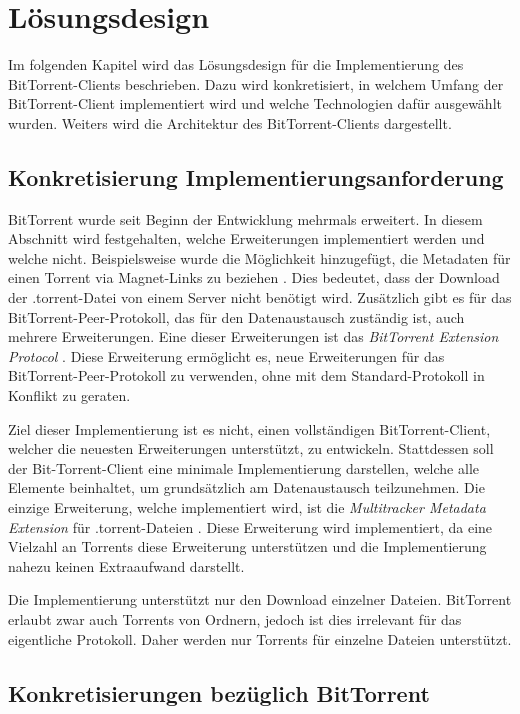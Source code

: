 \chapter{Lösungsdesign}
\label{cha:Lösungsdesign}
Im folgenden Kapitel wird das Lösungsdesign für die Implementierung des Bit\-Torrent-Clients beschrieben. Dazu wird konkretisiert, in welchem Umfang der Bit\-Torrent-Client implementiert wird und welche Technologien dafür ausgewählt wurden. Weiters wird die Architektur des BitTorrent-Clients dargestellt.

\section{Konkretisierung Implementierungsanforderung}

 BitTorrent wurde seit Beginn der Entwicklung mehrmals erweitert. In diesem Abschnitt wird festgehalten, welche Erweiterungen implementiert werden und welche nicht. Beispielsweise wurde die Möglichkeit hinzugefügt, die Metadaten für einen Torrent via Magnet-Links zu beziehen \parencite{bitTorrentMagnet}. Dies bedeutet, dass der Download der .torrent-Datei von einem Server nicht benötigt wird. Zusätzlich gibt es für das BitTorrent-Peer-Protokoll, das für den Datenaustausch zuständig ist, auch mehrere Erweiterungen. Eine dieser Erweiterungen ist das \emph{BitTorrent Extension Protocol} \parencite{bitTorrentExtensionProtocol}. Diese Erweiterung ermöglicht es, neue Erweiterungen für das BitTorrent-Peer-Protokoll zu verwenden, ohne mit dem Standard-Protokoll in Konflikt zu geraten. 

Ziel dieser Implementierung ist es nicht, einen vollständigen BitTorrent-Client, welcher die neuesten Erweiterungen unterstützt, zu entwickeln. Stattdessen soll der Bit-Torrent-Client eine minimale Implementierung darstellen, welche alle Elemente beinhaltet, um grundsätzlich am Datenaustausch teilzunehmen. Die einzige Erweiterung, welche implementiert wird, ist die \emph{Multitracker Metadata Extension} für .torrent-Dateien \parencite{bitTorrentMultitrackerExtension}. Diese Erweiterung wird implementiert, da eine Vielzahl an Torrents diese Erweiterung unterstützen und die Implementierung nahezu keinen Extraaufwand darstellt. 

Die Implementierung unterstützt nur den Download einzelner Dateien. BitTorrent erlaubt zwar auch Torrents von Ordnern, jedoch ist dies irrelevant für das eigentliche Protokoll. Daher werden nur Torrents für einzelne Dateien unterstützt.

\section{Konkretisierungen bezüglich BitTorrent}

